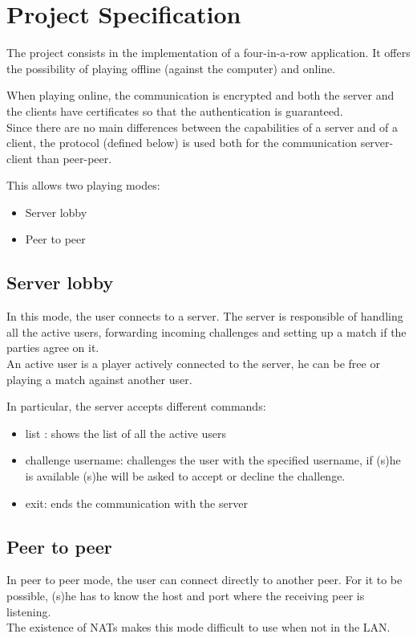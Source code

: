 \section{Project Specification}
The project consists in the implementation of a four-in-a-row application. It offers the possibility of playing offline (against the computer) and online.

When playing online, the communication is encrypted and both the server and the clients have certificates so that the authentication is guaranteed.\\
Since there are no main differences between the capabilities of a server and of a client, the protocol (defined below) is used both for the communication server-client than peer-peer.

This allows two playing modes:
\begin{itemize}
	\item Server lobby
	\item Peer to peer
\end{itemize}



\subsection{Server lobby}
In this mode, the user connects to a server. The server is responsible of handling all the active users, forwarding incoming challenges and setting up a match if the parties agree on it. \\
An active user is a player actively connected to the server, he can be free or playing a match against another user.

In particular, the server accepts different commands:
\begin{itemize}
	\item list : shows the list of all the active users
	\item challenge username:  challenges the user with the specified username, if (s)he is available (s)he will be asked to accept or decline the challenge.
	\item exit: ends the communication with the server
\end{itemize}

\subsection{Peer to peer}
In peer to peer mode, the user can connect directly to another peer. For it to be possible, (s)he has to know the host and port where the receiving peer is listening.\\
The existence of NATs makes this mode difficult to use when not in the LAN.

